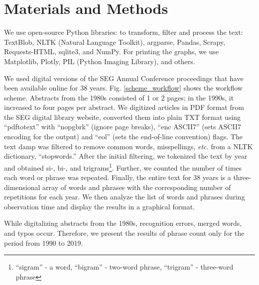 \documentclass[geosciences,article,submit,moreauthors,pdftex]{Definitions/mdpi}
\begin{document}
\section{Materials and Methods}

We use open-source Python libraries: to transform, filter and process the text: TextBlob, NLTK (Natural Language Toolkit), argparse, Pandas, Scrapy, Requests-HTML, sqlite3, and NumPy. For printing the graphs, we use Matplotlib, Plotly, PIL (Python Imaging Library), and others.

We used digital versions of the SEG Annual Conference proceedings that have been available online for 38 years. Fig. \ref{scheme_workflow} shows the workflow scheme. Abstracts from the 1980s consisted of 1 or 2 pages; in the 1990s, it increased to four pages per abstract. We digitized articles in PDF format from the SEG digital library website, converted them into plain TXT format using ``pdftotext'' with ``nopgbrk'' (ignore page breaks), ``enc ASCII7'' (sets ASCII7 encoding for the output) and ``eol'' (sets the end-of-line convention) flags. The text damp was filtered to remove common words, misspellings, \textit{etc.} from a NLTK dictionary, ``stopwords.'' After the initial filtering, we tokenized the text by year and obtained si-, bi-, and trigrams\footnote{``sigram'' - a word, ``bigram'' - two-word phrase, ``trigram'' - three-word phrase}. Further, we counted the number of times each word or phrase was repeated. Finally, the entire text for 38 years is a three-dimensional array of words and phrases with the corresponding number of repetitions for each year. We then analyze the list of words and phrases during observation time and display the results in a graphical format.

While digitalizing abstracts from the 1980s, recognition errors, merged words, and typos occur. Therefore, we present the results of phrase count only for the period from 1990 to 2019.
\end{document}
